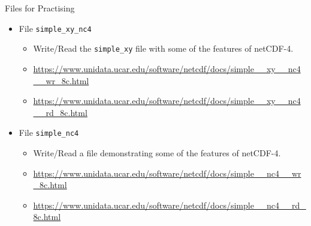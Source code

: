 \documentclass[compress,11pt,xcolor=svgnames,aspectratio=169]{beamer}
\begin{document}
\begin{frame}[fragile]{Files for Practising}

\begin{itemize}
\setlength\itemsep{0.4cm}

  \item File \verb|simple_xy_nc4|\\[0.3cm]
    \begin{itemize}
    \setlength\itemsep{0.2cm}
      \item {\footnotesize Write/Read the \verb|simple_xy| file with some of the features of netCDF-4.}
      \item {\scriptsize \url{https://www.unidata.ucar.edu/software/netcdf/docs/simple__xy__nc4__wr_8c.html}}
      \item {\scriptsize \url{https://www.unidata.ucar.edu/software/netcdf/docs/simple__xy__nc4__rd_8c.html}}
    \end{itemize}

  \item File \verb|simple_nc4|\\[0.3cm]
    \begin{itemize}
    \setlength\itemsep{0.2cm}
      \item {\footnotesize Write/Read a file demonstrating some of the features of netCDF-4.}
      \item {\scriptsize \url{https://www.unidata.ucar.edu/software/netcdf/docs/simple__nc4__wr_8c.html}}
      \item {\scriptsize \url{https://www.unidata.ucar.edu/software/netcdf/docs/simple__nc4__rd_8c.html}}
    \end{itemize}

\end{itemize}

\end{frame}
\end{document}
